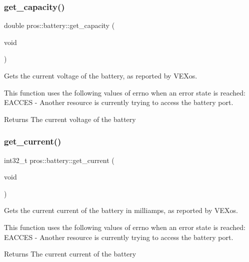 \subsubsection{\texorpdfstring{get\+\_\+capacity()}{get\_capacity()}}
{\footnotesize\ttfamily double pros\+::battery\+::get\+\_\+capacity (\begin{DoxyParamCaption}\item[{void}]{ }\end{DoxyParamCaption})}



Gets the current voltage of the battery, as reported by V\+E\+Xos. 

This function uses the following values of errno when an error state is reached\+: E\+A\+C\+C\+ES -\/ Another resource is currently trying to access the battery port.

\begin{DoxyReturn}{Returns}
The current voltage of the battery 
\end{DoxyReturn}
\mbox{\label{namespacepros_1_1battery_ad0f092e6341126d68ae15d41b5dba352}} 
\subsubsection{\texorpdfstring{get\+\_\+current()}{get\_current()}}
{\footnotesize\ttfamily int32\+\_\+t pros\+::battery\+::get\+\_\+current (\begin{DoxyParamCaption}\item[{void}]{ }\end{DoxyParamCaption})}



Gets the current current of the battery in milliamps, as reported by V\+E\+Xos. 

This function uses the following values of errno when an error state is reached\+: E\+A\+C\+C\+ES -\/ Another resource is currently trying to access the battery port.

\begin{DoxyReturn}{Returns}
The current current of the battery 
\end{DoxyReturn}
\mbox{\label{namespacepros_1_1battery_a33d1a503808ed06148a1884e3ccf88ae}} 
